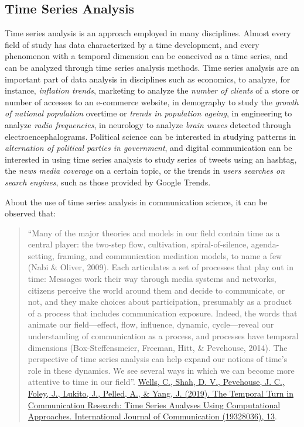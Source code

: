 \documentclass[
]{article}
\begin{document}
\hypertarget{time-series-analysis}{%
\subsection{Time Series Analysis}\label{time-series-analysis}}

Time series analysis is an approach employed in many disciplines. Almost every field of study has data characterized by a time development, and every phenomenon with a temporal dimension can be conceived as a time series, and can be analyzed through time series analysis methods. Time series analysis are an important part of data analysis in disciplines such as economics, to analyze, for instance, \emph{inflation trends}, marketing to analyze the \emph{number of clients} of a store or number of accesses to an e-commerce website, in demography to study the \emph{growth of national population} overtime or \emph{trends in population ageing}, in engineering to analyze \emph{radio frequencies}, in neurology to analyze \emph{brain waves} detected through electroencephalograms. Political science can be interested in studying patterns in \emph{alternation of political parties in government}, and digital communication can be interested in using time series analysis to study series of tweets using an hashtag, the \emph{news media coverage} on a certain topic, or the trends in \emph{users searches on search engines}, such as those provided by Google Trends.

About the use of time series analysis in communication science, it can be observed that:

\begin{quote}
``Many of the major theories and models in our field contain time as a central player: the two-step flow, cultivation, spiral-of-silence, agenda-setting, framing, and communication mediation models, to name a few (Nabi \& Oliver, 2009). Each articulates a set of processes that play out in time: Messages work their way through media systems and networks, citizens perceive the world around them and decide to communicate, or not, and they make choices about participation, presumably as a product of a process that includes communication exposure. Indeed, the words that animate our field---effect, flow, influence, dynamic, cycle---reveal our understanding of communication as a process, and processes have temporal dimensions (Box-Steffensmeier, Freeman, Hitt, \& Pevehouse, 2014). The perspective of time series analysis can help expand our notions of time's role in these dynamics. We see several ways in which we can become more attentive to time in our field''. \href{https://ijoc.org/index.php/ijoc/article/view/10635}{Wells, C., Shah, D. V., Pevehouse, J. C., Foley, J., Lukito, J., Pelled, A., \& Yang, J. (2019). The Temporal Turn in Communication Research: Time Series Analyses Using Computational Approaches. International Journal of Communication (19328036), 13}.
\end{quote}
\end{document}
